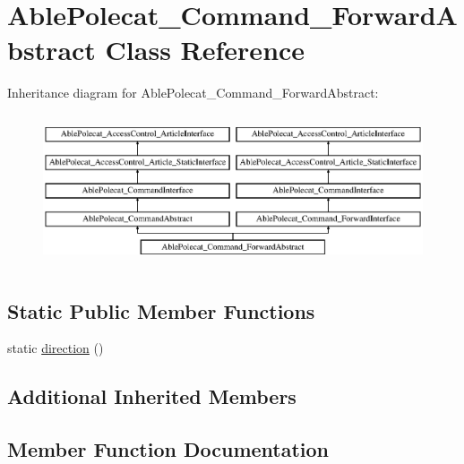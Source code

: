 \hypertarget{class_able_polecat___command___forward_abstract}{}\section{Able\+Polecat\+\_\+\+Command\+\_\+\+Forward\+Abstract Class Reference}
\label{class_able_polecat___command___forward_abstract}
Inheritance diagram for Able\+Polecat\+\_\+\+Command\+\_\+\+Forward\+Abstract\+:\begin{figure}[H]
\begin{center}
\leavevmode
\includegraphics[height=4.516129cm]{class_able_polecat___command___forward_abstract}
\end{center}
\end{figure}
\subsection*{Static Public Member Functions}
\begin{DoxyCompactItemize}
\item 
static \hyperlink{class_able_polecat___command___forward_abstract_a0f38ef3cd761210f2a667c669393498f}{direction} ()
\end{DoxyCompactItemize}
\subsection*{Additional Inherited Members}


\subsection{Member Function Documentation}
\hypertarget{class_able_polecat___command___forward_abstract_a0f38ef3cd761210f2a667c669393498f}{}
